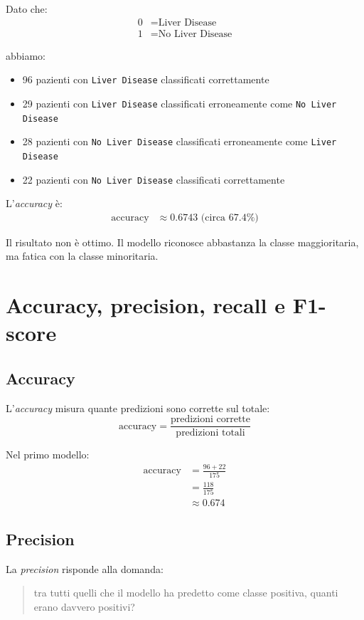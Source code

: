 \documentclass[11pt,a4paper]{article}
\begin{document}
Dato che:
\begin{align*}
    0 &= \text{Liver Disease} \\
    1 &= \text{No Liver Disease}
\end{align*}

abbiamo:
\begin{itemize}
    \item 96 pazienti con \texttt{Liver Disease} classificati correttamente
    \item 29 pazienti con \texttt{Liver Disease} classificati erroneamente come \texttt{No Liver Disease}
    \item 28 pazienti con \texttt{No Liver Disease} classificati erroneamente come \texttt{Liver Disease}
    \item 22 pazienti con \texttt{No Liver Disease} classificati correttamente
\end{itemize}

L'\textit{accuracy} è:
\begin{align*}
    \text{accuracy} &\approx 0.6743 \text{ (circa 67.4\%)}
\end{align*}

Il risultato non è ottimo. Il modello riconosce abbastanza la classe maggioritaria, ma fatica con la classe minoritaria.

\section{Accuracy, precision, recall e F1-score}
\subsection{Accuracy}
L'\textit{accuracy} misura quante predizioni sono corrette sul totale:
\begin{equation}
    \text{accuracy} = \frac{\text{predizioni corrette}}{\text{predizioni totali}}
\end{equation}

Nel primo modello:
\begin{align*}
    \text{accuracy} &= \frac{96 + 22}{175} \\
                    &= \frac{118}{175} \\
                    &\approx 0.674
\end{align*}

\subsection{Precision}
La \textit{precision} risponde alla domanda:
\begin{quote}
    tra tutti quelli che il modello ha predetto come classe positiva, quanti erano davvero positivi?
\end{quote}
\end{document}
